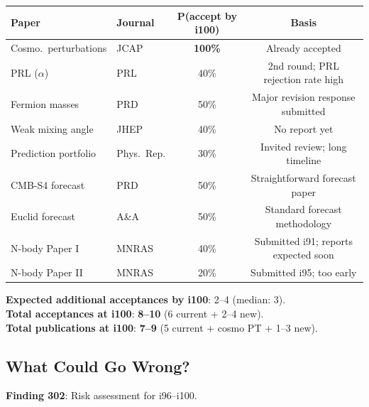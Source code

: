 \documentclass[11pt,a4paper]{article}
\begin{document}
\begin{tcolorbox}[colback=blue!5!white, colframe=dfdblue, title=\textbf{Journal Decision Projections for i96--i100}]
\begin{tabular}{p{4cm}lcc}
\toprule
\textbf{Paper} & \textbf{Journal} & \textbf{P(accept by i100)} & \textbf{Basis} \\
\midrule
Cosmo.\ perturbations & JCAP & \textbf{100\%} & Already accepted \\
PRL ($\alpha$) & PRL & 40\% & 2nd round; PRL rejection rate high \\
Fermion masses & PRD & 50\% & Major revision response submitted \\
Weak mixing angle & JHEP & 40\% & No report yet \\
Prediction portfolio & Phys.\ Rep. & 30\% & Invited review; long timeline \\
CMB-S4 forecast & PRD & 50\% & Straightforward forecast paper \\
Euclid forecast & A\&A & 50\% & Standard forecast methodology \\
N-body Paper I & MNRAS & 40\% & Submitted i91; reports expected soon \\
N-body Paper II & MNRAS & 20\% & Submitted i95; too early \\
\bottomrule
\end{tabular}

\textbf{Expected additional acceptances by i100}: 2--4 (median: 3).\\
\textbf{Total acceptances at i100}: \textbf{8--10} (6 current + 2--4 new).\\
\textbf{Total publications at i100}: \textbf{7--9} (5 current + cosmo PT + 1--3 new).
\end{tcolorbox}

\subsection{What Could Go Wrong?}

\textbf{Finding 302}: Risk assessment for i96--i100.
\end{document}
